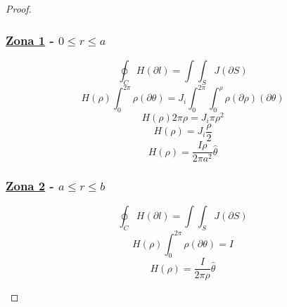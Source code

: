 \begin{proof}
\begin{enumerate}
        \subsubsection*{\underline{Zona 1} - \(0 \leq r \leq a\)}
        \begin{equation}
            \oint_C H (\partial l) = \int\int_{S} J (\partial S)
        \end{equation}
        \begin{equation}
            H(\rho)\int_{0}^{2\pi} \rho (\partial \theta) = J_{i} \int_{0}^{2\pi} \int_{0}^{\rho} \rho (\partial \rho )(\partial \theta )
        \end{equation}
        \begin{equation}
            H(\rho) 2\pi \rho = J_{i} \pi \rho^{2}
        \end{equation}
        \begin{equation}
            H(\rho) = J_{i} \frac{\rho}{2}
        \end{equation}
        \begin{equation}
            H(\rho) = \frac{I\rho}{2\pi a^{2}} \hat{\theta}
        \end{equation}
        
        \subsubsection*{ \underline{Zona 2} - $a \leq r \leq  b $}
        \begin{equation}
            \oint_C H (\partial l) = \int\int_{S} J (\partial S)
        \end{equation}
        \begin{equation}
             H(\rho)\int_{0}^{2\pi} \rho (\partial \theta) = I
        \end{equation}
        \begin{equation}
            H(\rho) = \frac{I}{2\pi \rho} \hat{\theta}
        \end{equation}
        

\end{enumerate}
\end{proof}
